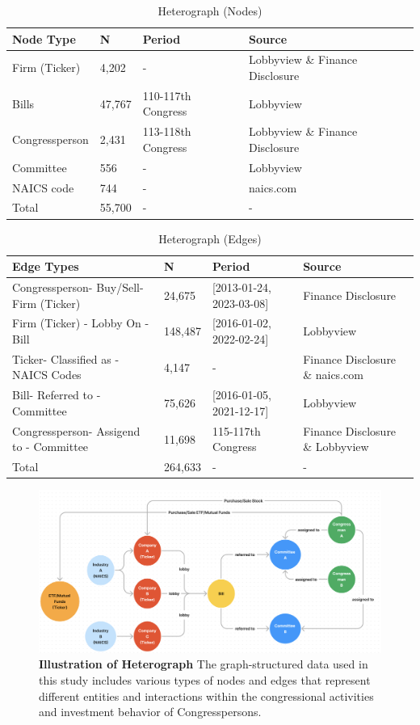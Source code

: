 \documentclass[15pt,letterpaper]{article}
\begin{document}
\begin{table}[h!]
  \centering
  \caption{Heterograph (Nodes)}
  \label{tab:nodes}
  \begin{tabular}{@{}llll@{}}
  \toprule
  Node Type & N & Period & Source \\ \midrule
  Firm (Ticker) & 4,202 & - & Lobbyview \& Finance Disclosure \\
  Bills & 47,767 & 110-117th Congress & Lobbyview \\
  Congressperson & 2,431 & 113-118th Congress & Lobbyview \& Finance Disclosure \\
  Committee & 556 & - & Lobbyview \\
  NAICS code & 744 & - &  naics.com \\ 
  \bottomrule
  Total & 55,700 & - & - \\
  \bottomrule

  \end{tabular}
\end{table}

\begin{table}[h!]
  \centering
  \caption{Heterograph (Edges)}
  \label{tab:edges}
  \begin{tabular}{@{}llll@{}}
  \toprule
  Edge Types & N & Period & Source \\ \midrule
  Congressperson- Buy/Sell- Firm (Ticker) & 24,675 & [2013-01-24, 2023-03-08] & Finance Disclosure \\
  Firm (Ticker) - Lobby On - Bill & 148,487 & [2016-01-02, 2022-02-24] & Lobbyview \\
  Ticker- Classified as - NAICS Codes & 4,147 & - & Finance Disclosure \& naics.com \\
  Bill- Referred to - Committee & 75,626 & [2016-01-05, 2021-12-17] & Lobbyview \\
  Congressperson- Assigend to - Committee & 11,698 & 115-117th Congress & Finance Disclosure \& Lobbyview \\ 
  \bottomrule
  Total & 264,633 & - & - \\
  \bottomrule
  \end{tabular}
  \end{table}

\begin{figure}[h!]
  \centering
  \includegraphics[width=1.0\textwidth]{imgs/etfmf.png}
  \caption{\textbf{Illustration of Heterograph} The graph-structured data used in this study includes various types of nodes and edges that represent different entities and interactions within the congressional activities and investment behavior of Congresspersons.}
  \label{fig:cbd}
\end{figure}
\end{document}

